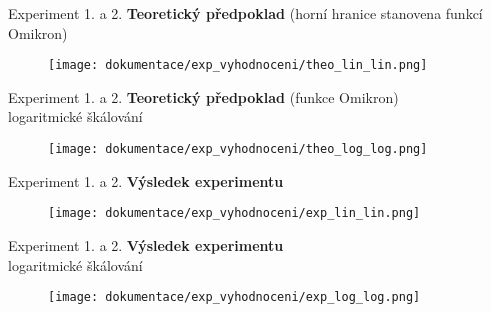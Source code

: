 \documentclass[xcolor=dvipsnames,table,10pt]{beamer}
\begin{document}
\begin{frame}{Experiment 1. a 2.}
    \textbf{Teoretick\'y p\v{r}edpoklad} (horn\'i hranice stanovena funkc\'i Omikron)
    \begin{figure}
        \centering
        \texttt{[image: dokumentace/exp\_vyhodnoceni/theo\_lin\_lin.png]}
    \end{figure}
    
\end{frame}

\begin{frame}{Experiment 1. a 2.}
    \textbf{Teoretick\'y p\v{r}edpoklad} (funkce Omikron)\\
    logaritmick\'e \v{s}k\'alov\'an\'i
    \begin{figure}
        \centering
        \texttt{[image: dokumentace/exp\_vyhodnoceni/theo\_log\_log.png]}
    \end{figure}
    
\end{frame}

\begin{frame}{Experiment 1. a 2.}
    \textbf{V\'ysledek experimentu}
    \begin{figure}
        \centering
        \texttt{[image: dokumentace/exp\_vyhodnoceni/exp\_lin\_lin.png]}
    \end{figure}
    
\end{frame}

\begin{frame}{Experiment 1. a 2.}
    \textbf{V\'ysledek experimentu}\\
    logaritmick\'e \v{s}k\'alov\'an\'i
    \begin{figure}
        \centering
        \texttt{[image: dokumentace/exp\_vyhodnoceni/exp\_log\_log.png]}
    \end{figure}
    
\end{frame}
\end{document}

